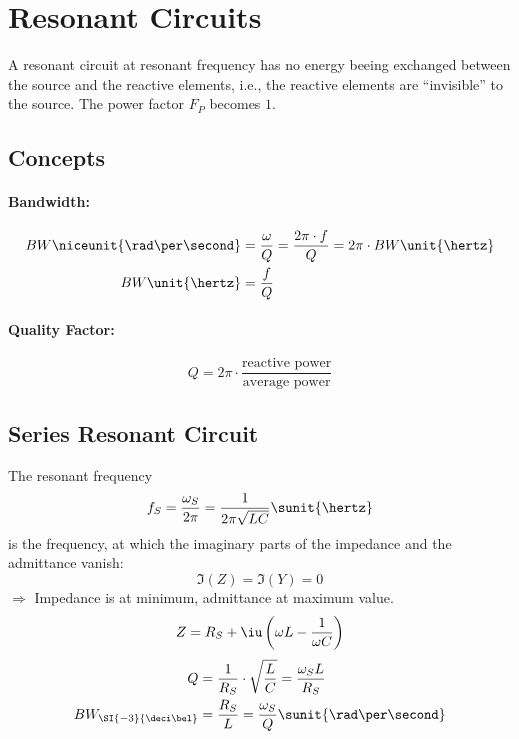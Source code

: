
\section{Resonant Circuits} %
	
	A resonant circuit at resonant frequency has no energy beeing exchanged between the source and the reactive elements, i.e., the reactive elements are ``invisible'' to the source. The power factor $F_P$ becomes $1$.
	
	\subsection{Concepts} %
		\paragraph{Bandwidth:} %
			\begin{align*}
				BW \niceunit{\rad\per\second} &= \frac{\omega}{Q} = \frac{2\pi\cdot f}{Q} = 2\pi \cdot BW\unit{\hertz} \\
				BW \unit{\hertz} &= \frac{f}{Q}
			\end{align*}
		\paragraph{Quality Factor:} %
			\[
				Q = 2\pi \cdot \frac{\text{reactive power}}{\text{average power}}
			\]

	\subsection{Series Resonant Circuit} %
		The resonant frequency
		\[
			f_S = \frac{\omega_S}{2\pi} = \frac{1}{2\pi\sqrt{LC}} \sunit{\hertz}
		\]
		is the frequency, at which the imaginary parts of the impedance and the admittance vanish:
		\[
			\Im(Z) = \Im(Y) = 0
		\]
		$\Rightarrow$ Impedance is at minimum, admittance at maximum value.
		\[
			Z = R_S + \iu \left(
				\omega L - \frac{1}{\omega C}
			\right)
		\]
		\begin{align*}
			Q &= \frac{1}{R_S}\cdot \sqrt{\frac{L}{C}} = \frac{\omega_S L}{R_S} \\
			BW_{\SI{-3}{\deci\bel}} &= \frac{R_S}{L} = \frac{\omega_S}{Q} \sunit{\rad\per\second}
		\end{align*}
